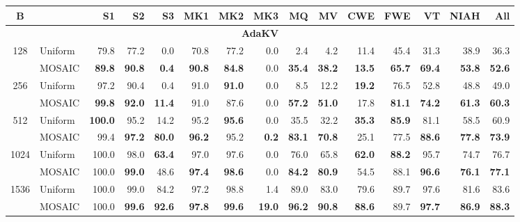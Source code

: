 \begin{table}[tp]
  \centering
  \scriptsize
  \setlength{\tabcolsep}{4pt}
  \renewcommand{\arraystretch}{0.92}
  \begin{tabular}{@{} c l rrrrrrrrrrrrr @{}}
    \toprule
    \textbf{B} & & \textbf{S1} & \textbf{S2} & \textbf{S3} & \textbf{MK1} & \textbf{MK2} & \textbf{MK3} & \textbf{MQ} & \textbf{MV} & \textbf{CWE} & \textbf{FWE} & \textbf{VT} & \textbf{NIAH} & \textbf{All} \\
    \midrule
    \multicolumn{15}{c}{\textbf{AdaKV}} \\
    \midrule
    \multirow{2}{*}{128} & Uniform & 79.8 & 77.2 & 0.0 & 70.8 & 77.2 & 0.0 & 2.4 & 4.2 & 11.4 & 45.4 & 31.3 & 38.9 & 36.3 \\
     & MOSAIC & \textbf{89.8} & \textbf{90.8} & \textbf{0.4} & \textbf{90.8} & \textbf{84.8} & 0.0 & \textbf{35.4} & \textbf{38.2} & \textbf{13.5} & \textbf{65.7} & \textbf{69.4} & \textbf{53.8} & \textbf{52.6} \\
    \cmidrule(l){1-15}
    \multirow{2}{*}{256} & Uniform & 97.2 & 90.4 & 0.4 & 91.0 & \textbf{91.0} & 0.0 & 8.5 & 12.2 & \textbf{19.2} & 76.5 & 52.8 & 48.8 & 49.0 \\
     & MOSAIC & \textbf{99.8} & \textbf{92.0} & \textbf{11.4} & 91.0 & 87.6 & 0.0 & \textbf{57.2} & \textbf{51.0} & 17.8 & \textbf{81.1} & \textbf{74.2} & \textbf{61.3} & \textbf{60.3} \\
    \cmidrule(l){1-15}
    \multirow{2}{*}{512} & Uniform & \textbf{100.0} & 95.2 & 14.2 & 95.2 & \textbf{95.6} & 0.0 & 35.5 & 32.2 & \textbf{35.3} & \textbf{85.9} & 81.1 & 58.5 & 60.9 \\
     & MOSAIC & 99.4 & \textbf{97.2} & \textbf{80.0} & \textbf{96.2} & 95.2 & \textbf{0.2} & \textbf{83.1} & \textbf{70.8} & 25.1 & 77.5 & \textbf{88.6} & \textbf{77.8} & \textbf{73.9} \\
    \cmidrule(l){1-15}
    \multirow{2}{*}{1024} & Uniform & 100.0 & 98.0 & \textbf{63.4} & 97.0 & 97.6 & 0.0 & 76.0 & 65.8 & \textbf{62.0} & \textbf{88.2} & 95.7 & 74.7 & 76.7 \\
     & MOSAIC & 100.0 & \textbf{99.0} & 48.6 & \textbf{97.4} & \textbf{98.6} & 0.0 & \textbf{84.2} & \textbf{80.9} & 54.5 & 88.1 & \textbf{96.6} & \textbf{76.1} & \textbf{77.1} \\
    \cmidrule(l){1-15}
    \multirow{2}{*}{1536} & Uniform & 100.0 & 99.0 & 84.2 & 97.2 & 98.8 & 1.4 & 89.0 & 83.0 & 79.6 & 89.7 & 97.6 & 81.6 & 83.6 \\
     & MOSAIC & 100.0 & \textbf{99.6} & \textbf{92.6} & \textbf{97.8} & \textbf{99.6} & \textbf{19.0} & \textbf{96.2} & \textbf{90.8} & \textbf{88.6} & 89.7 & \textbf{97.7} & \textbf{86.9} & \textbf{88.3} \\

\end{tabular}
\end{table}
